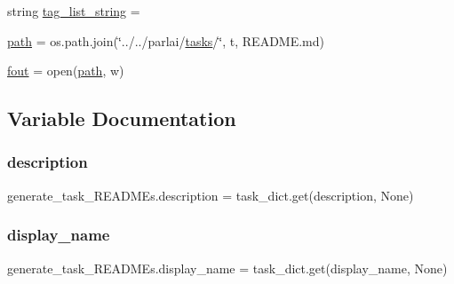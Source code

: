\begin{DoxyCompactItemize}
\item 
string \hyperlink{namespacegenerate__task__READMEs_a7b092bf14e09c4d0daeb749f1a42eecb}{tag\+\_\+list\+\_\+string} = \textquotesingle{}\textquotesingle{}
\item 
\hyperlink{namespacegenerate__task__READMEs_ae2eccad91867a8cb484ed9d5d92187e1}{path} = os.\+path.\+join(\char`\"{}../../parlai/\hyperlink{namespacegenerate__task__READMEs_a8f4da8ba04584af52e0e9e2f209245c2}{tasks}/\char`\"{}, t, \textquotesingle{}R\+E\+A\+D\+M\+E.\+md\textquotesingle{})
\item 
\hyperlink{namespacegenerate__task__READMEs_a5ee0f93b9dd3539a16bd60d77a2a87a4}{fout} = open(\hyperlink{namespacegenerate__task__READMEs_ae2eccad91867a8cb484ed9d5d92187e1}{path}, \textquotesingle{}w\textquotesingle{})
\end{DoxyCompactItemize}


\subsection{Variable Documentation}
\mbox{\label{namespacegenerate__task__READMEs_a1fa3d286642336f46142b43041428763}} 
\subsubsection{\texorpdfstring{description}{description}}
{\footnotesize\ttfamily generate\+\_\+task\+\_\+\+R\+E\+A\+D\+M\+Es.\+description = task\+\_\+dict.\+get(\textquotesingle{}description\textquotesingle{}, None)}

\mbox{\label{namespacegenerate__task__READMEs_ae22075b887eb68b5bfef641a5deb2200}} 
\subsubsection{\texorpdfstring{display\+\_\+name}{display\_name}}
{\footnotesize\ttfamily generate\+\_\+task\+\_\+\+R\+E\+A\+D\+M\+Es.\+display\+\_\+name = task\+\_\+dict.\+get(\textquotesingle{}display\+\_\+name\textquotesingle{}, None)}

